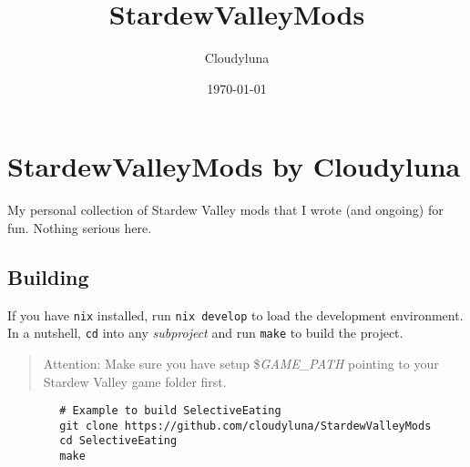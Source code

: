 \documentclass[a4paper,12pt]{article}
\title{StardewValleyMods}
\author{Cloudyluna}
\date{\today}
\begin{document}
	
	\section{StardewValleyMods by Cloudyluna}
	
	My personal collection of Stardew Valley mods that I wrote (and ongoing) for fun. Nothing serious here.
	
	
	\subsection{Building}
	
	If you have \texttt{nix} installed, run \texttt{nix develop} to load the development environment.
	In a nutshell, \texttt{cd} into any \textit{subproject} and run \texttt{make} to build the project.
	
	\begin{quote}
		Attention: Make sure you have setup \$\textit{GAME\_PATH} pointing to your Stardew Valley game folder first.
	\end{quote}
	
	\begin{verbatim}
		# Example to build SelectiveEating
		git clone https://github.com/cloudyluna/StardewValleyMods
		cd SelectiveEating
		make
	\end{verbatim}
	
	\thanksto
	
	\licensenotice
	
	
\end{document}
